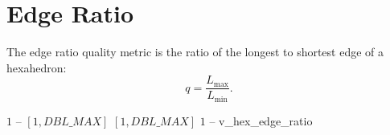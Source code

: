 \section{Edge Ratio\label{s:hex-edge-ratio}}

The edge ratio quality metric is the ratio of the longest to
shortest edge of a hexahedron:
\[
q = \frac{L_{\max}}{L_{\min}}.
\]

%
{$1$}%
{--}%
{$[1,DBL\_MAX]$}%
{$[1,DBL\_MAX]$}%
{$1$}%
{--}%
{v\_hex\_edge\_ratio}%
